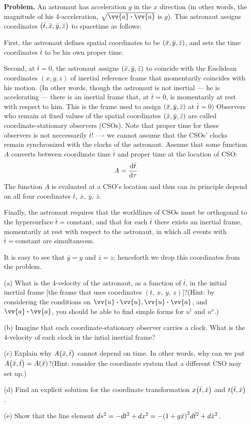 \documentclass[12pt, a4paper, oneside]{article}
\newcounter{problemname}
\newenvironment{problem}{\begin{shaded}\stepcounter{problemname}\par\noindent\textbf{Problem\arabic{problemname}. }}{\end{shaded}\par}
\begin{document}
\begin{problem}
    An astronaut has acceleration $g$ in the $x$ direction (in other words, the magnitude of his 4-acceleration, $\sqrt{\vv{a}\vdot\vv{a}}$ is $g$). This astronaut assigns coordinates $\qty(\bar{t}, \bar{x}, \bar{y}, \bar{z})$ to spacetime as follows:
    
    First, the astronaut defines spatial coordinates to be $\qty(\bar{x}, \bar{y}, \bar{z})$, and sets the time coordinates $\bar{t}$ to be his own proper time.

    Second, at $\bar{t}=0$, the astronaut assigns $\qty(\bar{x}, \bar{y}, \bar{z})$ to coincide with the Euclidean coordinates $(x, y, z)$ of inertial reference frame that momentarily coincides with his motion. (In other words, though the astronaut is not inertial --- he is accelerating --- there is an inertial frame that, at $\bar{t}=0$, is momentarily at rest with respect to him. This is the frame used to assign $\qty(\bar{x}, \bar{y}, \bar{z})$ at $\bar{t}=0$) Observers who remain at fixed values of the spatial coordinates $\qty(\bar{x}, \bar{y}, \bar{z})$ are called coordinate-stationary observers (CSOs). Note that proper time for these observers is not neccessarily $\bar{t}$! ---- we cannot assume that the CSOs' clocks remain synchronized with the clocks of the astronaut. Assume that some function $A$ converts between coordinate time $\bar{t}$ and proper time at the location of CSO:
    \[
    A=\dv{\bar{t}}{\tau}
    \]
    The function $A$ is evaluated at a CSO's location and thus can in principle depend on all four coordinates $\bar{t},\ \bar{x},\ \bar{y},\ \bar{z}$.

    Finally, the astronaut requires that the worldlines of CSOs must be orthogonal to the hypersurface $\bar{t} = \text{constant}$, and that for each $\bar{t}$ there exists an inertial frame, momentarily at rest with respect to the astronaut, in which all events with $\bar{t}=\text{constant}$ are simultaneous.

    It is easy to see that $\bar{y}=y$ and $\bar{z}=z$; henceforth we drop this coordinates from the problem.

    (a) What is the 4-velocity of the astronaut, as a function of $\bar{t}$, in the initial inertial frame [the frame that uses coordinates $(t,\ x,\ y,\ z)$]?(Hint: by considering the conditions on $\vv{u}\vdot\vv{u}, \vv{u}\vdot\vv{a}$, and $\vv{a}\vdot\vv{a}$, you should be able to find simple forms for $u^t$ and $u^x$.)

    (b) Imagine that each coordinate-stationary observer carries a clock. What is the 4-velocity of each clock in the intial inertial frame?

    (c) Explain why $A\qty(\bar{x}, \bar{t})$ cannot depend on time. In other words, why can we put $A\qty(\bar{x}, \bar{t})=A(\bar{x})$?(Hint: consider the coordinate system that a different CSO may set up.)

    (d) Find an explicit solution for the coordinate transformation $x\qty(\bar{t}, \bar{x})$ and $t\qty(\bar{t}, \bar{x})$.

    (e) Show that the line element $ds^2 = -dt^2 + dx^2 = -\qty(1+g\bar{x})^2d\bar{t}^2 + d\bar{x}^2$.
\end{problem}
\end{document}
